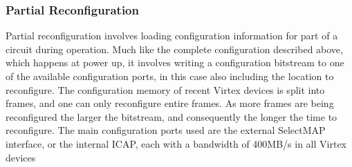 \documentclass[12pt,drafta4paper,oneside]{memoir} %
\begin{document}
\subsubsection{Partial Reconfiguration}
Partial reconfiguration involves loading configuration information for part of a circuit during operation. Much like the complete configuration described above, which happens at power up, it involves writing a configuration bitstream to one of the available configuration ports, in this case also including the location to reconfigure. The configuration memory of recent Virtex devices is split into frames, and one can only reconfigure entire frames. As more frames are being reconfigured the larger the bitstream, and consequently the longer the time to reconfigure. The main configuration ports used are the external SelectMAP interface, or the internal \ac{ICAP}, each with a bandwidth of 400MB/s in all Virtex devices \cite{XCell33,DiesselChange}
\end{document}

